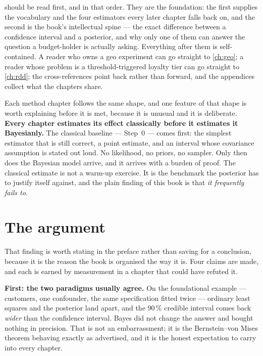  should be read first, and in that order. They are the foundation:
the first supplies the vocabulary and the four estimators every later chapter falls back on, and
the second is the book's intellectual spine --- the exact difference between a confidence
interval and a posterior, and why only one of them can answer the question a budget-holder is
actually asking. Everything after them is self-contained. A reader who owns a geo experiment can
go straight to \cref{ch:geo}; a reader whose problem is a threshold-triggered loyalty tier can go
straight to \cref{ch:rdd}; the cross-references point back rather than forward, and the appendices
collect what the chapters share.

Each method chapter follows the same shape, and one feature of that shape is worth explaining
before it is met, because it is unusual and it is deliberate. \textbf{Every chapter estimates its
effect classically before it estimates it Bayesianly.} The classical baseline --- Step~0 --- comes
first: the simplest estimator that is still correct, a point estimate, and an interval whose
covariance assumption is stated out loud. No likelihood, no priors, no sampler. Only then does the
Bayesian model arrive, and it arrives with a burden of proof. The classical estimate is not a warm-up
exercise. It is the benchmark the posterior has to justify itself against, and the plain finding of
this book is that \emph{it frequently fails to}.

\section*{The argument}

That finding is worth stating in the preface rather than saving for a conclusion, because it is
the reason the book is organised the way it is. Four claims are made, and each is earned by
measurement in a chapter that could have refuted it.

\textbf{First: the two paradigms usually agree.} On the foundational example ---
\nbZeroNCustomers{} customers, one confounder, the same specification fitted twice --- ordinary
least squares and the posterior land \eur{\nbZeroEstGap} apart, and the 90\,\% credible interval
comes back \pc{\nbZeroWidthRatioPct} \emph{wider} than the confidence interval. Bayes did not
change the answer and bought nothing in precision. That is not an embarrassment; it is the
Bernstein--von Mises theorem behaving exactly as advertised, and it is the honest expectation to
carry into every chapter.

